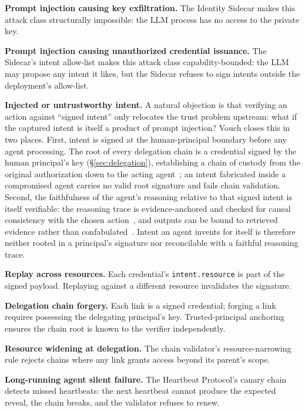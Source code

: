 \documentclass[11pt,a4paper]{article}
\begin{document}
\noindent\textbf{Prompt injection causing key exfiltration.} The Identity Sidecar makes this attack class structurally impossible: the LLM process has no access to the private key.

\noindent\textbf{Prompt injection causing unauthorized credential issuance.} The Sidecar's intent allow-list makes this attack class capability-bounded: the LLM may propose any intent it likes, but the Sidecar refuses to sign intents outside the deployment's allow-list.

\noindent\textbf{Injected or untrustworthy intent.} A natural objection is that verifying an action against ``signed intent'' only relocates the trust problem upstream: what if the captured intent is itself a product of prompt injection? Vouch closes this in two places. First, intent is signed at the human-principal boundary before any agent processing. The root of every delegation chain is a credential signed by the human principal's key (\S\ref{sec:delegation}), establishing a chain of custody from the original authorization down to the acting agent~\cite{pad002}; an intent fabricated inside a compromised agent carries no valid root signature and fails chain validation. Second, the faithfulness of the agent's reasoning relative to that signed intent is itself verifiable: the reasoning trace is evidence-anchored and checked for causal consistency with the chosen action~\cite{pad017}, and outputs can be bound to retrieved evidence rather than confabulated~\cite{pad045}. Intent an agent invents for itself is therefore neither rooted in a principal's signature nor reconcilable with a faithful reasoning trace.

\noindent\textbf{Replay across resources.} Each credential's \verb|intent.resource| is part of the signed payload. Replaying against a different resource invalidates the signature.

\noindent\textbf{Delegation chain forgery.} Each link is a signed credential; forging a link requires possessing the delegating principal's key. Trusted-principal anchoring ensures the chain root is known to the verifier independently.

\noindent\textbf{Resource widening at delegation.} The chain validator's resource-narrowing rule rejects chains where any link grants access beyond its parent's scope.

\noindent\textbf{Long-running agent silent failure.} The Heartbeat Protocol's canary chain detects missed heartbeats: the next heartbeat cannot produce the expected reveal, the chain breaks, and the validator refuses to renew.
\end{document}
